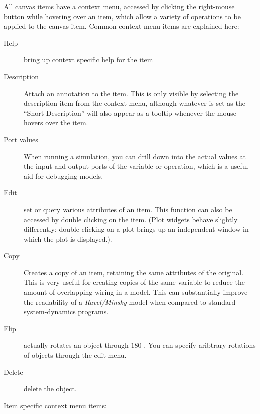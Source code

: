 All canvas items have a context menu, accessed by clicking the right-mouse
button while hovering over an item, which allow a variety of operations
to be applied to the canvas item. Common context menu items are explained
here: 
\begin{description}
\item [{Help}] bring up context specific help for the item 
\item [{Description}] Attach an annotation to the item. This is only visible
by selecting the description item from the context menu, although
whatever is set as the ``Short Description'' will also appear as
a tooltip whenever the mouse hovers over the item. 
\item [{Port values}] When running a simulation, you can drill down into
the actual values at the input and output ports of the variable or
operation, which is a useful aid for debugging models. 
\item [{Edit}] set or query various attributes of an item. This function
can also be accessed by double clicking on the item. (Plot widgets
behave slightly differently: double-clicking on a plot brings up an
independent window in which the plot is displayed.). 
\item [{Copy}] Creates a copy of an item, retaining the same attributes
of the original. This is very useful for creating copies of the same
variable to reduce the amount of overlapping wiring in a model. This
can substantially improve the readability of a \emph{Ravel/Minsky}
model when compared to standard system-dynamics programs.
\item [{Flip}] actually rotates an object through $180^{\circ}$. You can
specify aribtrary rotations of objects through the edit menu. 
\item [{Delete}] delete the object. 
\end{description}
Item specific context menu items: 
